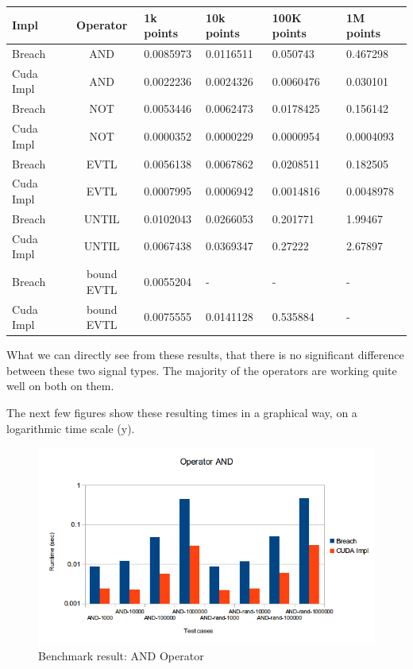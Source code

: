 \documentclass[a4paper,10pt]{article}
\begin{document}
\begin{center}
	\begin{tabular}{| l | c || l | l | l | l |}
	    \hline
	    Impl & Operator & 1k points & 10k points & 100K points & 1M points \\
	    \hline \hline
	    Breach & AND & 0.0085973 & 0.0116511 & 0.050743 & 0.467298 \\
	    Cuda Impl & AND & 0.0022236 & 0.0024326 & 0.0060476 & 0.030101  \\
	    \hline \hline   
	    Breach & NOT & 0.0053446 & 0.0062473 & 0.0178425 & 0.156142 \\
	    Cuda Impl & NOT & 0.0000352 & 0.0000229 & 0.0000954 & 0.0004093 \\
	    \hline \hline   
        Breach & EVTL & 0.0056138 & 0.0067862 & 0.0208511 & 0.182505  \\
        Cuda Impl & EVTL & 0.0007995 & 0.0006942 & 0.0014816 & 0.0048978  \\
	    \hline \hline   
        Breach & UNTIL & 0.0102043 & 0.0266053 & 0.201771 & 1.99467  \\
        Cuda Impl & UNTIL & 0.0067438 & 0.0369347 & 0.27222 & 2.67897  \\        
	    \hline \hline   
        Breach & bound EVTL & 0.0055204 & - & - & -  \\
        Cuda Impl & bound EVTL  & 0.0075555 & 0.0141128 & 0.535884 & - \\        
	    \hline
	\end{tabular}
	\label{tab: bechmark results signal type2}
\end{center}

What we can directly see from these results, that there is no significant difference between
these two signal types. The majority of the operators are working quite well on both on them. 

The next few figures show these resulting times in a graphical way, on a logarithmic time scale (y).

\begin{figure}[H]
    \includegraphics[scale=0.5]{bm_and.png}
    \caption{
        \label{fig:bm_and}
        Benchmark result: AND Operator}
\end{figure}
\end{document}
